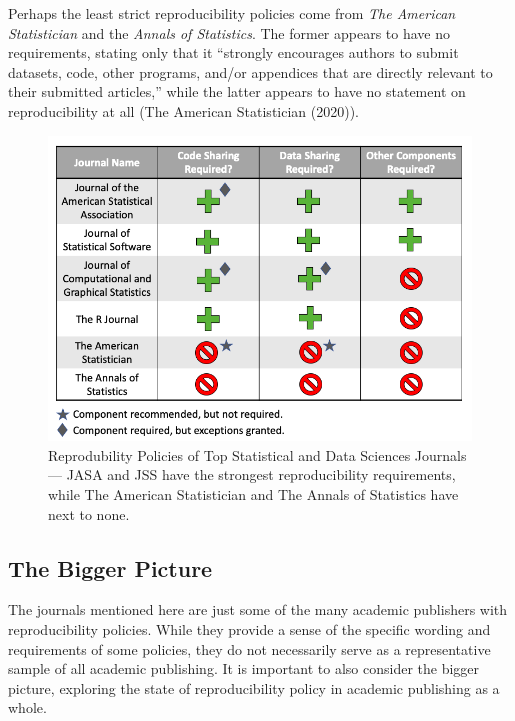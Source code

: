 \documentclass[12pt,twoside]{reedthesis}
\begin{document}
Perhaps the least strict reproducibility policies come from \emph{The American Statistician} and the \emph{Annals of Statistics}. The former appears to have no requirements, stating only that it ``strongly encourages authors to submit datasets, code, other programs, and/or appendices that are directly relevant to their submitted articles,'' while the latter appears to have no statement on reproducibility at all (The American Statistician (2020)).
\begin{figure}

{\centering \includegraphics[width=1\linewidth]{figure/stats-journals} 

}

\caption{Reprodubility Policies of Top Statistical and Data Sciences Journals --- JASA and JSS have the strongest reproducibility requirements, while The American Statistician and The Annals of Statistics have next to none.}\label{fig:unnamed-chunk-5}
\end{figure}
\hypertarget{the-bigger-picture}{%
\subsection{The Bigger Picture}\label{the-bigger-picture}}

The journals mentioned here are just some of the many academic publishers with reproducibility policies. While they provide a sense of the specific wording and requirements of some policies, they do not necessarily serve as a representative sample of all academic publishing. It is important to also consider the bigger picture, exploring the state of reproducibility policy in academic publishing as a whole.
\end{document}
